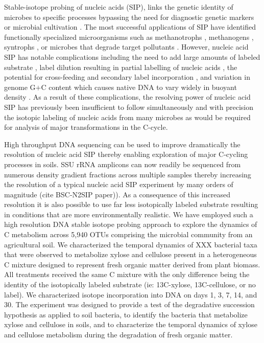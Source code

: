 Stable-isotope probing of nucleic acids (SIP), links the genetic identity of
microbes to specific processes bypassing the need for diagnostic genetic
markers or microbial cultivation \citep{Chen_Murrell_2010}. The most successful
applications of SIP have identified functionally specialized microorganisms
such as methanotrophs \citep{radajewski2000stable}, methanogens
\citep{Lu_2005}, syntrophs \citep{Lueders2004}, or microbes that degrade target
pollutants \citep{DeRito2005}. However, nucleic acid SIP has notable
complications including the need to add large amounts of labeled substrate
\citep{radajewski2000stable}, label dilution resulting in partial labelling of
nucleic acids \citep{radajewski2000stable,Manefield_2002,McDonald_2005}, the
potential for cross-feeding and secondary label incorporation
\citep{Morris_2002,Hutchens2004,14686943,DeRito2005,McDonald_2005,Ziegler_2005},
and variation in genome G$+$C content which causes native DNA to vary widely in
buoyant density \citep{Buckley_2007,9780408708036,Holben1995,Nusslein1999}. As
a result of these complications, the resolving power of nucleic acid SIP has
previously been insufficient to follow simultaneously and with precision the
isotopic labeling of nucleic acids from many microbes as would be required for
analysis of major transformations in the C-cycle. 

High throughput DNA sequencing can be used to improve dramatically the
resolution of nucleic acid SIP thereby enabling exploration of major C-cycling
processes in soils. SSU rRNA amplicons can now readily be sequenced from
numerous density gradient fractions across multiple samples thereby increasing
the resolution of a typical nucleic acid SIP experiment by many orders of
magnitude (cite BSC-N2SIP paper)). As a consequence of this increased
resolution it is also possible to use far less isotopically labeled substrate
resulting in conditions that are more environmentally realistic. We have
employed such a high resolution DNA stable isotope probing approach to explore
the dynamics of C metabolism across 5,940 OTUs comprising the microbial
community from an agricultural soil. We characterized the temporal dynamics of
XXX bacterial taxa that were observed to metabolize xylose and cellulose
present in a heterogeneous C mixture designed to represent fresh organic matter
derived from plant biomass. All treatments received the same C mixture with the
only difference being the identity of the isotopically labeled substrate (ie:
13C-xylose, 13C-cellulose, or no label). We characterized isotope incorporation
into DNA on days 1, 3, 7, 14, and 30. The experiment was designed to provide
a test of the degradative succession hypothesis as applied to soil bacteria, to
identify the bacteria that metabolize xylose and cellulose in soils, and to
characterize the temporal dynamics of xylose and cellulose metabolism during
the degradation of fresh organic matter. 

